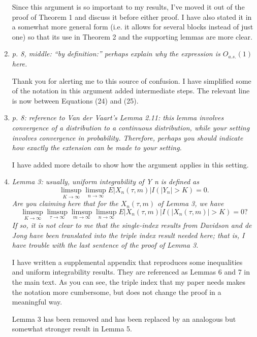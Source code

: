 \documentclass[12pt]{article}
\begin{document}
\begin{enumerate}
  Since this argument is so important to my results, I've moved it out
  of the proof of Theorem 1 and discuss it before either proof. I have
  also stated it in a somewhat more general form (i.e. it allows for
  several blocks instead of just one) so that its use in Theorem 2 and
  the supporting lemmas are more clear.

\item \emph{p. 8, middle: ``by definition:'' perhaps explain why the
    expression is $O_{a.s.}(1)$ here.}

  Thank you for alerting me to this source of confusion. I have
  simplified some of the notation in this argument added intermediate
  steps. The relevant line is now between Equations (24) and (25).

\item \emph{p. 8: reference to Van der Vaart's Lemma 2.11: this lemma
    involves convergence of a distribution to a continuous
    distribution, while your setting involves convergence in
    probability. Therefore, perhaps you should indicate how exactly
    the extension can be made to your setting.}

  I have added more details to show how the argument applies in this
  setting.

\item \emph{Lemma 3: usually, uniform integrability of Y n is defined as
    \begin{equation*}
      \limsup_{K \to \infty} \limsup_{n \to \infty} E|X_n(\tau,m)| I(|Y_n| > K) = 0.
    \end{equation*}
    Are you claiming here that for the $X_n(τ, m)$ of Lemma 3, we have
    \begin{equation*}
      \limsup_{K \to \infty} \limsup_{\tau\to\infty} \limsup_{m \to \infty} \limsup_{n \to \infty}
      E|X_n(\tau, m)|I(|X_n(\tau, m)| > K) = 0?
    \end{equation*}
    If so, it is not clear to me that the single-index results from
    Davidson and de Jong have been translated into the triple index
    result needed here; that is, I have trouble with the last sentence
    of the proof of Lemma 3.}

  I have written a supplemental appendix that reproduces some
  inequalities and uniform integrability results. They are referenced
  as Lemmas 6 and 7 in the main text. As you can see, the triple index
  that my paper needs makes the notation more cumbersome, but does not
  change the proof in a meaningful way.

  Lemma 3 has been removed and has been replaced by an analogous but
  somewhat stronger result in Lemma 5.


\end{enumerate}
\end{document}
